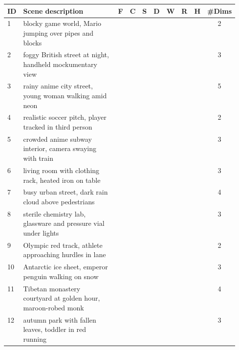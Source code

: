 \documentclass{llmxive}
\providecommand{\cmark}{\ding{51}}
\providecommand{\xmark}{\ding{55}}
\providecommand{\arraystretch}{1.05}
\begin{document}
\begin{table}[!htbp]
\centering
\scriptsize
\setlength{\tabcolsep}{3pt}
\renewcommand{\arraystretch}{1.05}
\begin{tabular}{@{}l p{0.55\linewidth} ccccccc c@{}}
\toprule
\textbf{ID} & \textbf{Scene description} & \textbf{F} & \textbf{C} & \textbf{S} & \textbf{D} & \textbf{W} & \textbf{R} & \textbf{H} & \textbf{\#Dims} \\
\midrule
1   & blocky game world, Mario jumping over pipes and blocks                & \xmark & \cmark & \xmark & \xmark & \xmark & \xmark & \cmark & 2 \\
2   & foggy British street at night, handheld mockumentary view             & \xmark & \cmark & \xmark & \xmark & \xmark & \cmark & \cmark & 3 \\
3   & rainy anime city street, young woman walking amid neon                & \cmark & \cmark & \cmark & \xmark & \xmark & \cmark & \cmark & 5 \\
4   & realistic soccer pitch, player tracked in third person                & \xmark & \cmark & \xmark & \xmark & \xmark & \xmark & \cmark & 2 \\
5   & crowded anime subway interior, camera swaying with train              & \xmark & \cmark & \xmark & \xmark & \xmark & \cmark & \cmark & 3 \\
6   & living room with clothing rack, heated iron on table                  & \xmark & \cmark & \xmark & \cmark & \xmark & \cmark & \xmark & 3 \\
7   & busy urban street, dark rain cloud above pedestrians                  & \xmark & \cmark & \cmark & \xmark & \xmark & \cmark & \cmark & 4 \\
8   & sterile chemistry lab, glassware and pressure vial under lights       & \xmark & \cmark & \xmark & \xmark & \xmark & \cmark & \cmark & 3 \\
9   & Olympic red track, athlete approaching hurdles in lane                & \xmark & \cmark & \xmark & \xmark & \xmark & \xmark & \cmark & 2 \\
10  & Antarctic ice sheet, emperor penguin walking on snow                  & \xmark & \xmark & \cmark & \xmark & \cmark & \xmark & \cmark & 3 \\
11  & Tibetan monastery courtyard at golden hour, maroon-robed monk         & \xmark & \cmark & \xmark & \xmark & \cmark & \cmark & \cmark & 4 \\
12  & autumn park with fallen leaves, toddler in red running                & \xmark & \cmark & \xmark & \xmark & \cmark & \xmark & \cmark & 3 \\

\end{tabular}
\end{table}
\end{document}
